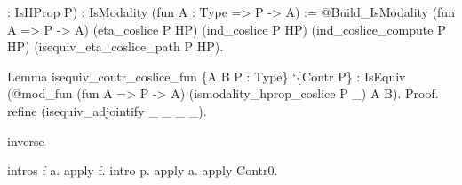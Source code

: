 \begin{coqdoccode}
\begin{coqdoccomment}
:\coqdocindent{0.50em}
IsHProp\coqdocindent{0.50em}
P)\coqdocindent{0.50em}
\coqdoceol
\coqdocindent{1.00em}
:\coqdocindent{0.50em}
IsModality\coqdocindent{0.50em}
(fun\coqdocindent{0.50em}
A\coqdocindent{0.50em}
:\coqdocindent{0.50em}
Type\coqdocindent{0.50em}
=>\coqdocindent{0.50em}
P\coqdocindent{0.50em}
->\coqdocindent{0.50em}
A)\coqdoceol
\coqdocindent{1.00em}
:=\coqdocindent{0.50em}
@Build\_IsModality\coqdocindent{0.50em}
(fun\coqdocindent{0.50em}
A\coqdocindent{0.50em}
=>\coqdocindent{0.50em}
P\coqdocindent{0.50em}
->\coqdocindent{0.50em}
A)\coqdoceol
\coqdocindent{13.50em}
(eta\_coslice\coqdocindent{0.50em}
P\coqdocindent{0.50em}
HP)\coqdoceol
\coqdocindent{13.50em}
(ind\_coslice\coqdocindent{0.50em}
P\coqdocindent{0.50em}
HP)\coqdoceol
\coqdocindent{13.50em}
(ind\_coslice\_compute\coqdocindent{0.50em}
P\coqdocindent{0.50em}
HP)\coqdoceol
\coqdocindent{13.50em}
(isequiv\_eta\_coslice\_path\coqdocindent{0.50em}
P\coqdocindent{0.50em}
HP).\coqdoceol
\end{coqdoccomment}
\coqdoceol
\coqdocemptyline
\coqdocnoindent
\begin{coqdoccomment}
\coqdoceol
Lemma\coqdocindent{0.50em}
isequiv\_contr\_coslice\_fun\coqdocindent{0.50em}
\{A\coqdocindent{0.50em}
B\coqdocindent{0.50em}
P\coqdocindent{0.50em}
:\coqdocindent{0.50em}
Type\}\coqdocindent{0.50em}
`\{Contr\coqdocindent{0.50em}
P\}\coqdocindent{0.50em}
:\coqdocindent{0.50em}
\coqdoceol
\coqdocindent{1.00em}
IsEquiv\coqdocindent{0.50em}
(@mod\_fun\coqdocindent{0.50em}
(fun\coqdocindent{0.50em}
A\coqdocindent{0.50em}
=>\coqdocindent{0.50em}
P\coqdocindent{0.50em}
->\coqdocindent{0.50em}
A)\coqdocindent{0.50em}
\coqdoceol
\coqdocindent{10.00em}
(ismodality\_hprop\_coslice\coqdocindent{0.50em}
P\coqdocindent{0.50em}
\_)\coqdoceol
\coqdocindent{10.00em}
A\coqdocindent{0.50em}
B).\coqdoceol
Proof.\coqdoceol
\coqdocindent{1.00em}
refine\coqdocindent{0.50em}
(isequiv\_adjointify\coqdocindent{0.50em}
\_\coqdocindent{0.50em}
\_\coqdocindent{0.50em}
\_\coqdocindent{0.50em}
\_).\coqdoceol
\coqdoceol
\coqdocindent{1.00em}
\begin{coqdoccomment}
\coqdocindent{0.50em}
inverse\coqdocindent{0.50em}
\end{coqdoccomment}
\coqdoceol
\coqdocindent{1.00em}
intros\coqdocindent{0.50em}
f\coqdocindent{0.50em}
a.\coqdoceol
\coqdocindent{1.00em}
apply\coqdocindent{0.50em}
f.\coqdocindent{0.50em}
intro\coqdocindent{0.50em}
p.\coqdocindent{0.50em}
apply\coqdocindent{0.50em}
a.\coqdocindent{0.50em}
apply\coqdocindent{0.50em}
Contr0.\coqdoceol
\coqdocindent{1.00em}
\coqdoceol
\coqdocindent{1.00em}

\end{coqdoccomment}
\end{coqdoccode}
